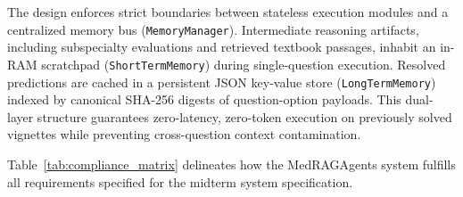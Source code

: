 The design enforces strict boundaries between stateless execution modules and a centralized memory bus (\texttt{MemoryManager}). Intermediate reasoning artifacts, including subspecialty evaluations and retrieved textbook passages, inhabit an in-RAM scratchpad (\texttt{ShortTermMemory}) during single-question execution. Resolved predictions are cached in a persistent JSON key-value store (\texttt{LongTermMemory}) indexed by canonical SHA-256 digests of question-option payloads. This dual-layer structure guarantees zero-latency, zero-token execution on previously solved vignettes while preventing cross-question context contamination.

Table~\ref{tab:compliance_matrix} delineates how the MedRAGAgents system fulfills all requirements specified for the midterm system specification.

